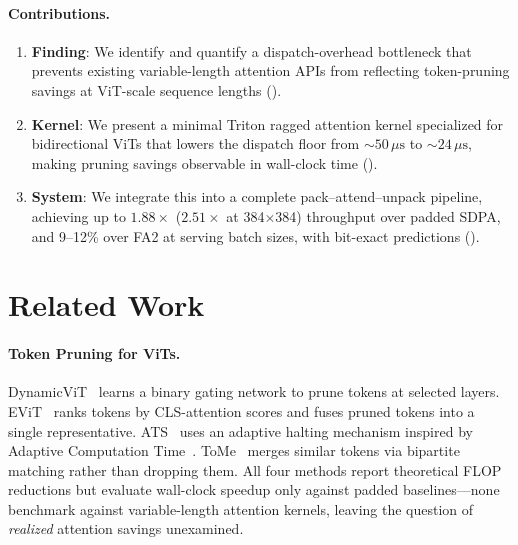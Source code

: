 \documentclass[conference]{IEEEtran}
\newcommand{\us}{\,\mu\text{s}}
\begin{document}
\paragraph{Contributions.}
\begin{enumerate}[nosep,leftmargin=*]
  \item \textbf{Finding}: We identify and quantify a
        dispatch-overhead bottleneck that prevents existing
        variable-length attention APIs from reflecting token-pruning
        savings at ViT-scale sequence lengths ().
  \item \textbf{Kernel}: We present a minimal Triton ragged attention
        kernel specialized for bidirectional ViTs that lowers the
        dispatch floor from ${\sim}50\us$ to ${\sim}24\us$, making
        pruning savings observable in wall-clock time
        ().
  \item \textbf{System}: We integrate this into a complete
        pack--attend--unpack pipeline, achieving up to
        $1.88\times$ ($2.51\times$ at 384$\times$384) throughput over
        padded SDPA, and 9--12\% over FA2 at serving batch sizes,
        with bit-exact predictions ().
\end{enumerate}

\section{Related Work}\label{sec:related}

\paragraph{Token Pruning for ViTs.}
DynamicViT~\cite{rao2021dynamicvit} learns a binary gating network
to prune tokens at selected layers.
EViT~\cite{liang2022evit} ranks tokens by CLS-attention scores and
fuses pruned tokens into a single representative.
ATS~\cite{fayyaz2022ats} uses an adaptive halting mechanism inspired
by Adaptive Computation Time~\cite{graves2016act}.
ToMe~\cite{bolya2023tome} merges similar tokens via bipartite matching
rather than dropping them.
All four methods report theoretical FLOP reductions but evaluate
wall-clock speedup only against padded baselines---none benchmark
against variable-length attention kernels, leaving the question of
\emph{realized} attention savings unexamined.
\end{document}
